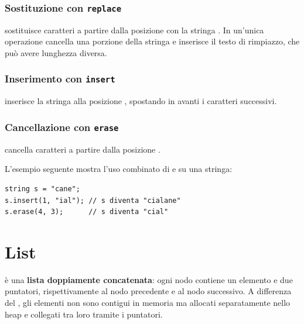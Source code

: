 \subsubsection{Sostituzione con \texttt{replace}}

 sostituisce 
caratteri a partire dalla posizione  con la stringa
.
In un'unica operazione cancella una porzione della stringa e inserisce
il testo di rimpiazzo, che pu\`o avere lunghezza diversa.

\subsubsection{Inserimento con \texttt{insert}}

 inserisce la stringa 
alla posizione , spostando in avanti i caratteri successivi.

\subsubsection{Cancellazione con \texttt{erase}}

 cancella  caratteri
a partire dalla posizione .

L'esempio seguente mostra l'uso combinato di 
e  su una stringa:

\begin{codeexample}
    \begin{codebox}
        \begin{lstlisting}
string s = "cane";
s.insert(1, "ial"); // s diventa "cialane"
s.erase(4, 3);      // s diventa "cial"
        \end{lstlisting}
    \end{codebox}
\end{codeexample}

\section{List}

 \`e una \textbf{lista doppiamente concatenata}:
ogni nodo contiene un elemento e due puntatori, rispettivamente al nodo
precedente e al nodo successivo. A differenza del ,
gli elementi non sono contigui in memoria ma allocati separatamente
nello heap e collegati tra loro tramite i puntatori.

